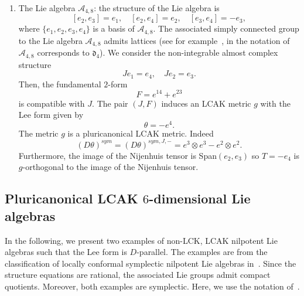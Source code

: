 \documentclass[a4paper,11pt]{amsart}
\theoremstyle{definition}
\renewcommand{\[}{\begin{equation*}}
\renewcommand{\]}{\end{equation*}}
\begin{document}
\begin{enumerate}
\item{The Lie algebra $\mathcal{A}_{4,8}$}: the structure of the Lie algebra is 
$$[e_2,e_3]=e_1,\quad [e_2,e_4]=e_2,\quad [e_3,e_4]=-e_3,$$
where $\{e_1,e_2,e_3,e_4\}$ is a basis of $\mathcal{A}_{4,8}$.
The associated simply connected group to the Lie algebra $\mathcal{A}_{4,8}$ admits lattices 
(see for example~\cite{MR3480018,MR4088745}, in the notation of~\cite{MR4088745} $\mathcal{A}_{4,8}$ corresponds to $\mathfrak{d}_{4}$).
We consider the non-integrable almost complex structure
$$Je_1=e_4,\quad Je_2=e_3.$$
Then, the fundamental $2$-form
$$F=e^{14}+e^{23}$$
is compatible with $J.$
The pair $(J,F)$ induces an LCAK metric $g$ with the Lee form given by
$$\theta=-e^4.$$
The metric  $g$ is a pluricanonical LCAK metric. Indeed $$(D\theta)^{sym}=(D\theta)^{sym,J,-}=e^3\otimes e^3 -e^2\otimes e^2.$$
Furthermore, the image of the Nijenhuis tensor is Span$(e_2,e_3)$ so $T=-e_4$ is $g$-orthogonal to the image of the Nijenhuis tensor.\\

\end{enumerate}

\subsection{Pluricanonical LCAK $6$-dimensional Lie algebras}\label{LCAK-dimension 6}
In the following, we present two examples of non-LCK, LCAK nilpotent Lie algebras such that the Lee form is $D$-parallel. The examples are from the classification of locally conformal symplectic nilpotent Lie algebras in~\cite{MR3767426}. Since the structure equations are rational, the associated Lie groups admit compact quotients. Moreover, both examples are symplectic. Here, we use the notation of~\cite{MR3767426}.
\end{document}
